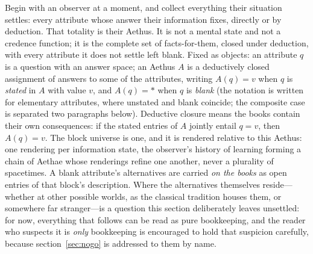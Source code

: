 \documentclass[11pt]{article}
\theoremstyle{definition}
\newcommand{\Aethus}{Aethus}
\begin{document}
Begin with an observer at a moment, and collect everything their situation settles: every attribute whose answer their information fixes, directly or by deduction. That totality is their \Aethus. It is not a mental state and not a credence function; it is the complete set of facts-for-them, closed under deduction, with every attribute it does not settle left blank. Fixed as objects: an attribute $q$ is a question with an answer space; an \Aethus{} $A$ is a deductively closed assignment of answers to some of the attributes, writing $A(q)=v$ when $q$ is \emph{stated} in $A$ with value $v$, and $A(q)=\ast$ when $q$ is \emph{blank} (the notation is written for elementary attributes, where unstated and blank coincide; the composite case is separated two paragraphs below). Deductive closure means the books contain their own consequences: if the stated entries of $A$ jointly entail $q=v$, then $A(q)=v$. The block universe is one, and it is rendered relative to this \Aethus: one rendering per information state, the observer's history of learning forming a chain of Aethae whose renderings refine one another, never a plurality of spacetimes. A blank attribute's alternatives are carried \emph{on the books} as open entries of that block's description. Where the alternatives themselves reside---whether at other possible worlds, as the classical tradition houses them, or somewhere far stranger---is a question this section deliberately leaves unsettled: for now, everything that follows can be read as pure bookkeeping, and the reader who suspects it is \emph{only} bookkeeping is encouraged to hold that suspicion carefully, because section~\ref{sec:nogo} is addressed to them by name.
\end{document}
